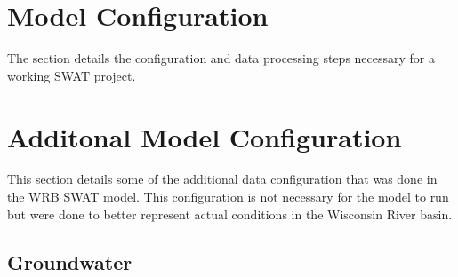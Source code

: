 	
\pagebreak
\section{Model Configuration}\label{sec:basic_model_config}
	The section details the configuration and data processing steps necessary for a working SWAT project.
	
	
	
	
	
	
	
	
\pagebreak


%		
	
\pagebreak
\section{Additonal Model Configuration}
	This section details some of the additional data configuration that was done in the WRB SWAT model. This configuration is not necessary for the model to run but were done to better represent actual conditions in the Wisconsin River basin.
	
	
	
	
	
	
\subsection{Groundwater}
	
	
	
	
\pagebreak